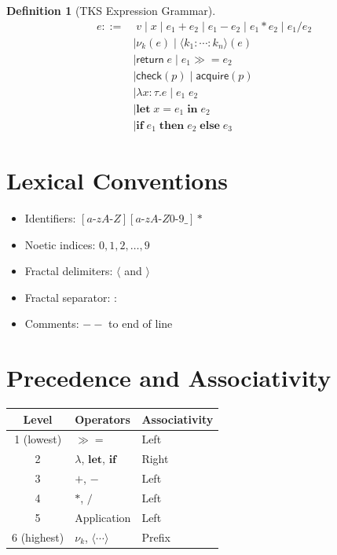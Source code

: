 \documentclass[11pt,twoside,openright]{book}
\theoremstyle{definition}
\newtheorem{definition}{Definition}[chapter]
\theoremstyle{plain}
\theoremstyle{remark}
\newcommand{\noe}[1]{\nu_{#1}}
\newcommand{\rpmret}{\mathsf{return}}
\newcommand{\rpmbind}{\mathbin{\gg\!=}}
\begin{document}
\begin{definition}[TKS Expression Grammar]
\label{def:tks-grammar}
\begin{align}
e ::=&\; v \mid x \mid e_1 + e_2 \mid e_1 - e_2 \mid e_1 * e_2 \mid e_1 / e_2 \\
    &\mid \noe{k}(e) \mid \langle k_1 : \cdots : k_n \rangle(e) \\
    &\mid \rpmret\; e \mid e_1 \rpmbind e_2 \\
    &\mid \mathsf{check}(p) \mid \mathsf{acquire}(p) \\
    &\mid \lambda x : \tau. e \mid e_1\; e_2 \\
    &\mid \mathbf{let}\; x = e_1\; \mathbf{in}\; e_2 \\
    &\mid \mathbf{if}\; e_1\; \mathbf{then}\; e_2\; \mathbf{else}\; e_3
\end{align}
\end{definition}

\section{Lexical Conventions}

\begin{itemize}
\item Identifiers: $[a\text{-}zA\text{-}Z][a\text{-}zA\text{-}Z0\text{-}9\_]*$
\item Noetic indices: $0, 1, 2, \ldots, 9$
\item Fractal delimiters: $\langle$ and $\rangle$
\item Fractal separator: $:$
\item Comments: $--$ to end of line
\end{itemize}

\section{Precedence and Associativity}

\begin{center}
\begin{tabular}{cll}
\toprule
\textbf{Level} & \textbf{Operators} & \textbf{Associativity} \\
\midrule
1 (lowest) & $\rpmbind$ & Left \\
2 & $\lambda$, $\mathbf{let}$, $\mathbf{if}$ & Right \\
3 & $+$, $-$ & Left \\
4 & $*$, $/$ & Left \\
5 & Application & Left \\
6 (highest) & $\noe{k}$, $\langle\cdots\rangle$ & Prefix \\
\bottomrule
\end{tabular}
\end{center}
\end{document}
